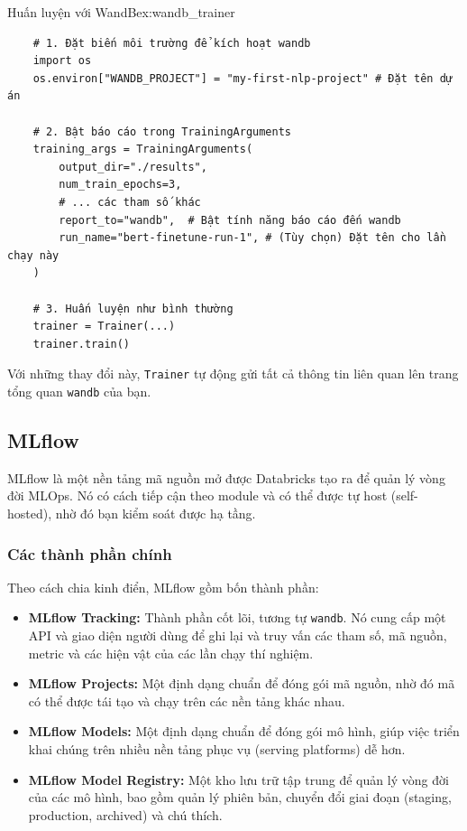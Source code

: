 \begin{example}{Huấn luyện với WandB}{ex:wandb_trainer}
    \begin{verbatim}
    # 1. Đặt biến môi trường để kích hoạt wandb
    import os
    os.environ["WANDB_PROJECT"] = "my-first-nlp-project" # Đặt tên dự án
    
    # 2. Bật báo cáo trong TrainingArguments
    training_args = TrainingArguments(
        output_dir="./results",
        num_train_epochs=3,
        # ... các tham số khác
        report_to="wandb",  # Bật tính năng báo cáo đến wandb
        run_name="bert-finetune-run-1", # (Tùy chọn) Đặt tên cho lần chạy này
    )
    
    # 3. Huấn luyện như bình thường
    trainer = Trainer(...)
    trainer.train()
    \end{verbatim}
\end{example}
Với những thay đổi này, \texttt{Trainer} tự động gửi tất cả thông tin liên quan lên trang tổng quan \texttt{wandb} của bạn.

\subsection{MLflow}
\label{ssec:mlflow}
MLflow là một nền tảng mã nguồn mở được Databricks tạo ra để quản lý vòng đời MLOps. Nó có cách tiếp cận theo module và có thể được tự host (self-hosted), nhờ đó bạn kiểm soát được hạ tầng.

\subsubsection{Các thành phần chính}
Theo cách chia kinh điển, MLflow gồm bốn thành phần:
\begin{itemize}
    \item \textbf{MLflow Tracking:} Thành phần cốt lõi, tương tự \texttt{wandb}. Nó cung cấp một API và giao diện người dùng để ghi lại và truy vấn các tham số, mã nguồn, metric và các hiện vật của các lần chạy thí nghiệm.
    \item \textbf{MLflow Projects:} Một định dạng chuẩn để đóng gói mã nguồn, nhờ đó mã có thể được tái tạo và chạy trên các nền tảng khác nhau.
    \item \textbf{MLflow Models:} Một định dạng chuẩn để đóng gói mô hình, giúp việc triển khai chúng trên nhiều nền tảng phục vụ (serving platforms) dễ hơn.
    \item \textbf{MLflow Model Registry:} Một kho lưu trữ tập trung để quản lý vòng đời của các mô hình, bao gồm quản lý phiên bản, chuyển đổi giai đoạn (staging, production, archived) và chú thích.
\end{itemize}

